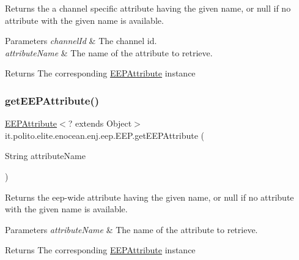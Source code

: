 Returns the a channel specific attribute having the given name, or null if no attribute with the given name is available.


\begin{DoxyParams}{Parameters}
{\em channel\+Id} & The channel id. \\
\hline
{\em attribute\+Name} & The name of the attribute to retrieve. \\
\hline
\end{DoxyParams}
\begin{DoxyReturn}{Returns}
The corresponding \hyperlink{classit_1_1polito_1_1elite_1_1enocean_1_1enj_1_1eep_1_1_e_e_p_attribute}{E\+E\+P\+Attribute} instance 
\end{DoxyReturn}
\hypertarget{classit_1_1polito_1_1elite_1_1enocean_1_1enj_1_1eep_1_1_e_e_p_a8b011e52ec7631d2bc1b8594a1840781}{}\label{classit_1_1polito_1_1elite_1_1enocean_1_1enj_1_1eep_1_1_e_e_p_a8b011e52ec7631d2bc1b8594a1840781} 
\subsubsection{\texorpdfstring{get\+E\+E\+P\+Attribute()}{getEEPAttribute()}}
{\footnotesize\ttfamily \hyperlink{classit_1_1polito_1_1elite_1_1enocean_1_1enj_1_1eep_1_1_e_e_p_attribute}{E\+E\+P\+Attribute}$<$? extends Object$>$ it.\+polito.\+elite.\+enocean.\+enj.\+eep.\+E\+E\+P.\+get\+E\+E\+P\+Attribute (\begin{DoxyParamCaption}\item[{String}]{attribute\+Name }\end{DoxyParamCaption})}

Returns the eep-\/wide attribute having the given name, or null if no attribute with the given name is available.


\begin{DoxyParams}{Parameters}
{\em attribute\+Name} & The name of the attribute to retrieve. \\
\hline
\end{DoxyParams}
\begin{DoxyReturn}{Returns}
The corresponding \hyperlink{classit_1_1polito_1_1elite_1_1enocean_1_1enj_1_1eep_1_1_e_e_p_attribute}{E\+E\+P\+Attribute} instance 
\end{DoxyReturn}
\hypertarget{classit_1_1polito_1_1elite_1_1enocean_1_1enj_1_1eep_1_1_e_e_p_a4070449b64e3a9d3882b784b80dc07b0}{}\label{classit_1_1polito_1_1elite_1_1enocean_1_1enj_1_1eep_1_1_e_e_p_a4070449b64e3a9d3882b784b80dc07b0} 
